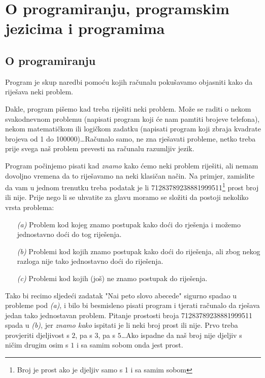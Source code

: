 \chapter{O programiranju, programskim jezicima i programima}

\section{O programiranju}

	Program je skup naredbi pomo\'{c}u kojih ra\v{c}unalu poku\v{s}avamo objasniti kako
	da rije\v{s}ava neki problem.

	Dakle, program pi\v{s}emo kad treba rije\v{s}iti neki
	problem. Mo\v{z}e se raditi o nekom
	svakodnevnom problemu (napisati program koji \'{c}e nam pamtiti brojeve telefona),
	nekom matemati\v{c}kom ili logi\v{c}kom zadatku (napisati program
	koji zbraja kvadrate brojeva od 1 do 100000)\dots Ra\v{c}unalo samo, ne zna
	rje\v{s}avati probleme, netko treba prije svega na\v{s} problem prevesti na 
	ra\v{c}unalu razumljiv jezik.

	Program po\v{c}injemo pisati kad \emph{znamo} kako \'{c}emo neki problem
	rije\v{s}iti, ali nemam dovoljno vremena da to rije\v{s}avamo na neki klasi\v{c}an
	na\v{c}in. Na primjer, zamislite da vam u jednom trenutku treba podatak je li
	71283789238881999511\footnote{Broj je prost ako je djeljiv samo s 1 i sa samim sobom} prost broj ili nije. Prije nego li se uhvatite za glavu moramo
	se slo\v{z}iti da postoji nekoliko vrsta problema:

	\begin{itemize}
		\item[\emph{(a)}] Problem kod kojeg znamo postupak kako do\'{c}i do rje\v{s}enja i
			mo\v{z}emo jednostavno do\'{c}i do tog rije\v{s}enja.
		\item[\emph{(b)}] Problemi kod kojih znamo postupak kako do\'{c}i do 
			rije\v{s}enja, ali zbog
			nekog razloga nije tako jednostavno do\'{c}i do rije\v{s}enja.
		\item[\emph{(c)}] Problemi kod kojih (jo\v{s}) ne znamo postupak do rije\v{s}enja.
	\end{itemize}

	Tako bi recimo sljede\'{c}i zadatak "Na\dj{}i peto slovo abecede" sigurno spadao u 
	probleme pod \emph{(a)}, i bilo bi besmisleno pisati program i tjerati ra\v{c}unalo
	da rje\v{s}ava jedan tako jednostavan problem. Pitanje prostosti broja 
	71283789238881999511 spada u \emph{(b)}, jer \emph{znamo kako} ispitati je li neki
	broj prost ili nije. Prvo treba provjeriti djeljivost s $2$, pa s $3$, pa s
	$5$\dots Ako ispadne da na\v{s} broj nije djeljiv s ni\v{c}im drugim osim s $1$ i
	sa samim sobom onda jest prost. 

